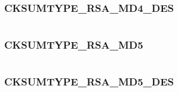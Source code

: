 \documentclass[letterpaper,10pt,english]{sphinxmanual}
\begin{document}
\subsubsection{CKSUMTYPE\_RSA\_MD4\_DES}
\label{appdev/refs/macros/CKSUMTYPE_RSA_MD4_DES::doc}\label{appdev/refs/macros/CKSUMTYPE_RSA_MD4_DES:cksumtype-rsa-md4-des}\label{appdev/refs/macros/CKSUMTYPE_RSA_MD4_DES:cksumtype-rsa-md4-des-data}

\begin{fulllineitems}
\label{appdev/refs/macros/CKSUMTYPE_RSA_MD4_DES:CKSUMTYPE_RSA_MD4_DES}
\end{fulllineitems}


\begin{tabulary}{\linewidth}{|L|L|}
\hline

 & 
\\
\hline\end{tabulary}



\subsubsection{CKSUMTYPE\_RSA\_MD5}
\label{appdev/refs/macros/CKSUMTYPE_RSA_MD5:cksumtype-rsa-md5-data}\label{appdev/refs/macros/CKSUMTYPE_RSA_MD5::doc}\label{appdev/refs/macros/CKSUMTYPE_RSA_MD5:cksumtype-rsa-md5}

\begin{fulllineitems}
\label{appdev/refs/macros/CKSUMTYPE_RSA_MD5:CKSUMTYPE_RSA_MD5}
\end{fulllineitems}


\begin{tabulary}{\linewidth}{|L|L|}
\hline

 & 
\\
\hline\end{tabulary}



\subsubsection{CKSUMTYPE\_RSA\_MD5\_DES}
\label{appdev/refs/macros/CKSUMTYPE_RSA_MD5_DES:cksumtype-rsa-md5-des-data}\label{appdev/refs/macros/CKSUMTYPE_RSA_MD5_DES::doc}\label{appdev/refs/macros/CKSUMTYPE_RSA_MD5_DES:cksumtype-rsa-md5-des}
\end{document}

